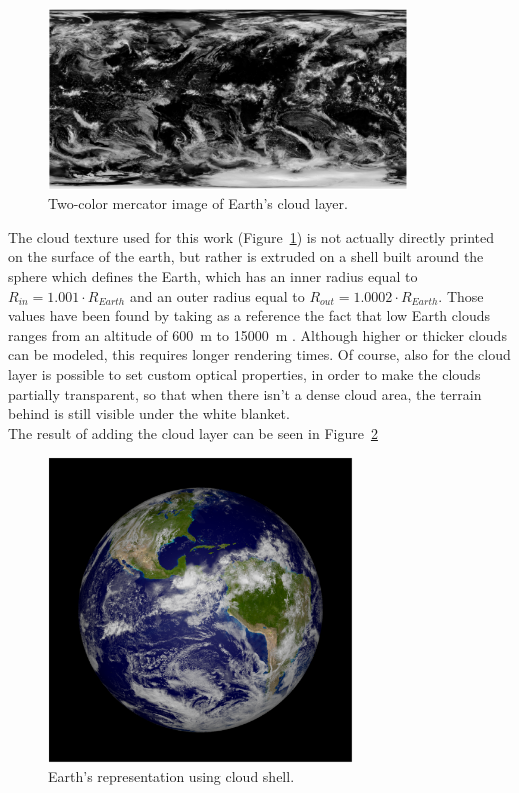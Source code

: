 \begin{figure}[htbp]
  \centering
  \includegraphics[width=0.85\textwidth]{gfx/clouds.eps}
  \caption{Two-color mercator image of Earth's cloud layer.}
  \label{fig:cloudsMercator}
\end{figure}

The cloud texture used for this work (Figure~\ref{fig:cloudsMercator}) is not actually directly printed on the surface of the earth, but rather is extruded on a shell built around the sphere which defines the Earth, which has an inner radius equal to $R_{in} = 1.001 \cdot R_{Earth}$ and an outer radius equal to $R_{out} = 1.0002 \cdot  R_{Earth}$. Those values have been found by taking as a reference the fact that low Earth clouds ranges from an altitude of \SI{600}{\m} to \SI{15000}{\m} \cite{nimbostratus}. Although higher or thicker clouds can be modeled, this requires longer rendering times. Of course, also for the cloud layer is possible to set custom optical properties, in order to make the clouds partially transparent, so that when there isn't a dense cloud area, the terrain behind is still visible under the white blanket.\\
The result of adding the cloud layer can be seen in Figure~\ref{fig:cloudShell}

\begin{figure}[htbp]
  \centering
  \includegraphics[width=0.72\textwidth]{gfx/cloudShell.eps}
  \caption{Earth's representation using cloud shell.}
  \label{fig:cloudShell}
\end{figure}

